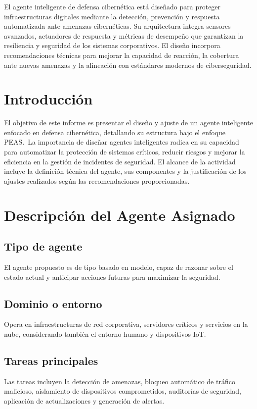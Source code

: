 \documentclass[letterpaper, 12pt]{report}
\begin{document}
El agente inteligente de defensa cibernética está diseñado para proteger
infraestructuras digitales mediante la detección, prevención y respuesta
automatizada ante amenazas cibernéticas. Su arquitectura integra sensores
avanzados, actuadores de respuesta y métricas de desempeño que garantizan la
resiliencia y seguridad de los sistemas corporativos. El diseño incorpora
recomendaciones técnicas para mejorar la capacidad de reacción, la cobertura
ante nuevas amenazas y la alineación con estándares modernos de ciberseguridad.

\section{Introducción}

El objetivo de este informe es presentar el diseño y ajuste de un agente
inteligente enfocado en defensa cibernética, detallando su estructura bajo el
enfoque PEAS.~La importancia de diseñar agentes inteligentes radica en su
capacidad para automatizar la protección de sistemas críticos, reducir riesgos
y mejorar la eficiencia en la gestión de incidentes de seguridad. El alcance de
la actividad incluye la definición técnica del agente, sus componentes y la
justificación de los ajustes realizados según las recomendaciones
proporcionadas.

\section{Descripción del Agente Asignado}

\subsection{Tipo de agente}
El agente propuesto es de tipo basado en modelo, capaz de razonar sobre el
estado actual y anticipar acciones futuras para maximizar la seguridad.

\subsection{Dominio o entorno}
Opera en infraestructuras de red corporativa, servidores críticos y servicios
en la nube, considerando también el entorno humano y dispositivos IoT.

\subsection{Tareas principales}
Las tareas incluyen la detección de amenazas, bloqueo automático de tráfico
malicioso, aislamiento de dispositivos comprometidos, auditorías de seguridad,
aplicación de actualizaciones y generación de alertas.
\end{document}
